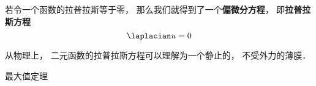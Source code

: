

若令一个函数的拉普拉斯等于零， 那么我们就得到了一个\textbf{偏微分方程}，%
 即\textbf{拉普拉斯方程}
\begin{equation}
\laplacian u = 0
\end{equation}

从物理上， 二元函数的拉普拉斯方程可以理解为一个静止的， 不受外力的薄膜．

\begin{theorem}{最大值定理}

\end{theorem}
